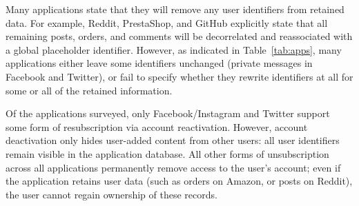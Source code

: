 Many applications state that they will remove any user identifiers from retained data.  For example,
Reddit, PrestaShop, and GitHub explicitly state that all remaining posts, orders, and comments will
be decorrelated and reassociated with a global placeholder identifier.  However, as indicated in
Table~\ref{tab:apps}, many applications either leave some identifiers unchanged (\eg private
messages in Facebook and Twitter), or fail to specify whether they rewrite identifiers at all for
some or all of the retained information.

Of the applications surveyed, only Facebook/Instagram and Twitter support some form of
resubscription via account reactivation. However, account deactivation only hides user-added content from
other users: all user identifiers remain visible in the application database. All other forms
of unsubscription across all applications permanently remove access to the user's account; even if
the application retains user data (such as orders on Amazon, or posts on Reddit), the user cannot
regain ownership of these records.

